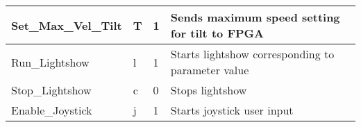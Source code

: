 \begin{table}[]
\begin{tabular}{ | l | l | l | p{5cm} |}
     Set\_Max\_Vel\_Tilt & T & 1 & Sends maximum speed setting for tilt to FPGA \\
    \hline
    
     Run\_Lightshow & l & 1 & Starts lightshow corresponding to parameter value \\
    \hline
    
     Stop\_Lightshow & c & 0 & Stops lightshow \\
    \hline
    
    Enable\_Joystick & j & 1 & Starts joystick user input \\
    \hline
    \end{tabular}
    
\end{table}

